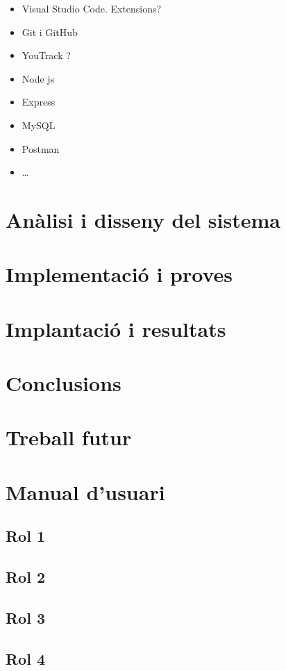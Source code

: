 \documentclass[a4paper,12pt]{ThesisStyle}
\begin{document}
\begin{itemize}
  \item Visual Studio Code. Extensions?
  \item Git i GitHub
  \item YouTrack ?
  \item Node js
  \item Express
  \item MySQL
  \item Postman
  \item \ldots
\end{itemize}

\chapter{Anàlisi i disseny del sistema}
\label{cap:analisi}



\chapter{Implementació i proves}
\label{cap:implementacio}



\chapter{Implantació i resultats}
\label{cap:implantacio}



\chapter{Conclusions}
\label{cap:conclusions}



\chapter{Treball futur}
\label{cap:treball_futur}




\backmatter





%

\chapter*{Manual d'usuari}

\section*{Rol 1}



\section*{Rol 2}



\section*{Rol 3}



\section*{Rol 4}
\end{document}
